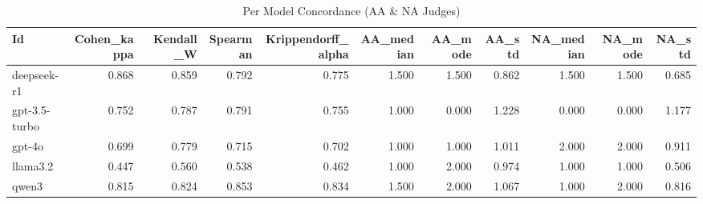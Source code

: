 \begin{table}
\caption{Per Model Concordance (AA & NA Judges)}
\label{tab:per_model_concordance_AA_NA_judges}
\begin{tabular}{lrrrrrrrrrr}
\toprule
Id & Cohen_kappa & Kendall_W & Spearman & Krippendorff_alpha & AA_median & AA_mode & AA_std & NA_median & NA_mode & NA_std \\
\midrule
deepseek-r1 & 0.868 & 0.859 & 0.792 & 0.775 & 1.500 & 1.500 & 0.862 & 1.500 & 1.500 & 0.685 \\
gpt-3.5-turbo & 0.752 & 0.787 & 0.791 & 0.755 & 1.000 & 0.000 & 1.228 & 0.000 & 0.000 & 1.177 \\
gpt-4o & 0.699 & 0.779 & 0.715 & 0.702 & 1.000 & 1.000 & 1.011 & 2.000 & 2.000 & 0.911 \\
llama3.2 & 0.447 & 0.560 & 0.538 & 0.462 & 1.000 & 2.000 & 0.974 & 1.000 & 1.000 & 0.506 \\
qwen3 & 0.815 & 0.824 & 0.853 & 0.834 & 1.500 & 2.000 & 1.067 & 1.000 & 2.000 & 0.816 \\
\bottomrule
\end{tabular}
\end{table}
